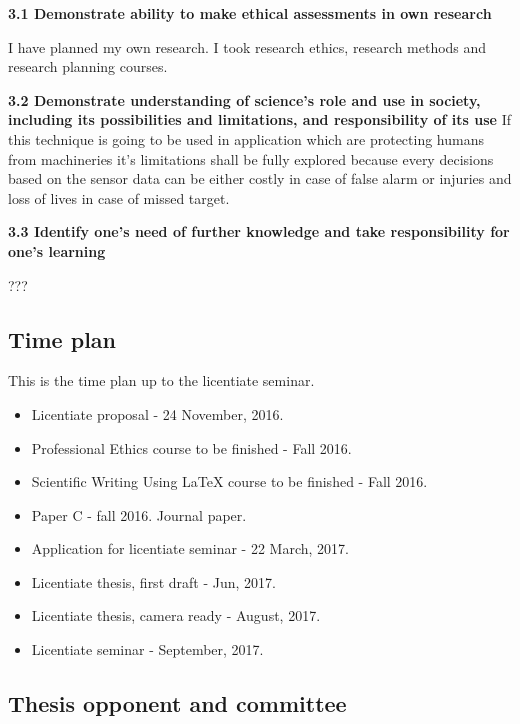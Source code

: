 \textbf{3.1 Demonstrate ability to make ethical assessments in own research}

I have planned my own research. I took  research ethics, research methods and research planning courses.

\textbf{3.2 Demonstrate understanding of science's role and use in society, including its possibilities and limitations, and responsibility of its use}
If this technique is going to be used in application which are protecting humans from machineries it's limitations shall be fully explored because every decisions based on the sensor data can be either costly in case of false alarm or injuries and loss of lives in case of missed target.

\textbf{3.3 Identify one's need of further knowledge and take responsibility for one's learning} 

???



\subsection{Time plan}
This is the time plan up to the licentiate seminar.
\begin{itemize}
	\item Licentiate proposal - 24 November, 2016.
	\item Professional Ethics course to be finished - Fall 2016.
	\item Scientific Writing Using LaTeX course to be finished - Fall 2016.
	\item Paper C - fall 2016. Journal paper.
	\item Application for licentiate seminar - 22 March, 2017.
	\item Licentiate thesis, first draft - Jun, 2017.
	\item Licentiate thesis, camera ready - August, 2017.
	\item Licentiate seminar - September, 2017.
\end{itemize}


\subsection{Thesis opponent and committee}